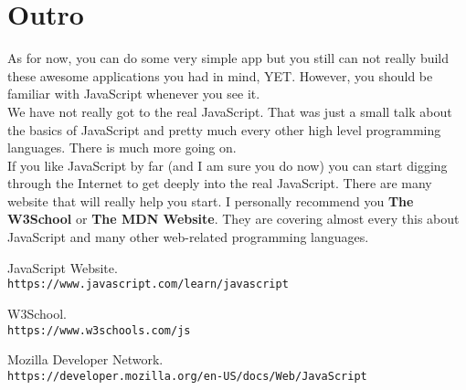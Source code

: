 \documentclass {book}
\begin{document}
	\chapter{Outro}
	As for now, you can do some very simple app but you still can not really build these awesome applications you had in mind, YET. However, you should be familiar with JavaScript whenever you see it.\\
	
	\noindent We have not really got to the real JavaScript. That was just a small talk about the basics of JavaScript and pretty much every other high level programming languages. There is much more going on.\\
	
	\noindent If you like JavaScript by far (and I am sure you do now) you can start digging through the Internet to get deeply into the real JavaScript. There are many website that will really help you start. I personally recommend you \textbf{The W3School} or \textbf{The MDN Website}. They are covering almost every this about JavaScript and many other web-related programming languages.
	
	
	
	\begin{thebibliography}{9}
		JavaScript Website. \\\texttt{https://www.javascript.com/learn/javascript}
		
		W3School. \\\texttt{https://www.w3schools.com/js}
		
		Mozilla Developer Network.
		\\\texttt{https://developer.mozilla.org/en-US/docs/Web/JavaScript}
	\end{thebibliography}

		
\end{document}
